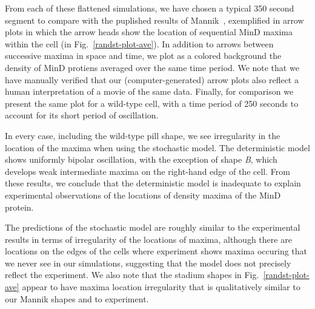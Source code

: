 \documentclass{pnastwo}
\newcommand{\red}[1]{{\bf \color{red} #1}}
\newcommand{\fixme}[1]{\red{[#1]}}
\begin{document}
\begin{article}
From each of these flattened simulations, we have chosen a typical 350
second segment to compare with the puplished results of
Mannik~\cite{mannik2012robustness}, exemplified in arrow plots in
which the arrow heads show the location of sequential MinD maxima
within the cell (in Fig.~\ref{randst-plot-ave}).  In addition to
arrows between successive maxima in space and time, we plot as a
colored background the density of MinD protiens averaged over the same
time period.  We note that we have manually verified that our
(computer-generated) arrow plots also reflect a human interpretation
of a movie of the same data.  Finally, for comparison we present the
same plot for a wild-type cell, with a time period of 250 seconds to
account for its short period of oscillation.

In every case, including the wild-type pill shape, we see irregularity
in the location of the maxima when using the stochastic model.  The
deterministic model shows uniformly bipolar oscillation, with the
exception of shape \emph{B}, which develops weak intermediate maxima
on the right-hand edge of the cell.  From these results, we conclude
that the deterministic model is inadequate to explain experimental
observations of the locations of density maxima of the MinD protein.


The predictions of the stochastic model are roughly similar to the
experimental results in terms of irregularity of the locations of
maxima, although there are locations on the edges of the cells where
experiment shows maxima occuring that we never see in our simulations,
suggesting that the model does not precisely reflect the experiment.
We also note that the stadium shapes in Fig.~\ref{randst-plot-ave}
appear to have maxima location irregularity that is qualitatively
similar to our Mannik shapes and to experiment.


\end{article}
\end{document}
